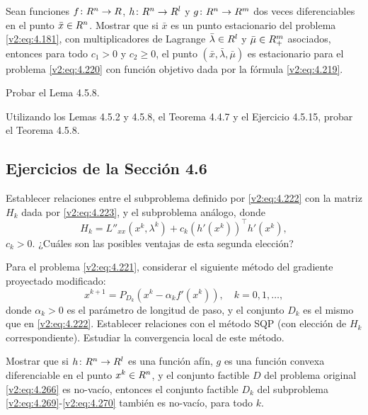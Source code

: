 \begin{exercise}\label{v2:ejer:4.5.15}
    Sean funciones $f \colon R^n \to R$, $h \colon R^n \to R^l$ y $g \colon R^n \to R^m$ dos veces diferenciables en el punto $\bar{x} \in R^n$. Mostrar que si $\bar{x}$ es un punto estacionario del problema \eqref{v2:eq:4.181}, con multiplicadores de Lagrange $\bar{\lambda} \in R^l$ y $\bar{\mu} \in R^m_+$ asociados, entonces para todo $c_1 > 0$ y $c_2 \ge 0$, el punto $(\bar{x}, \bar{\lambda}, \bar{\mu})$ es estacionario para el problema \eqref{v2:eq:4.220} con función objetivo dada por la fórmula \eqref{v2:eq:4.219}.
\end{exercise}

\begin{exercise}\label{v2:ejer:4.5.16}
    Probar el Lema 4.5.8.
\end{exercise}

\begin{exercise}\label{v2:ejer:4.5.17}
    Utilizando los Lemas 4.5.2 y 4.5.8, el Teorema 4.4.7 y el Ejercicio 4.5.15, probar el Teorema 4.5.8.
\end{exercise}

\subsection*{Ejercicios de la Sección 4.6}

\begin{exercise}\label{v2:ejer:4.6.1}
    Establecer relaciones entre el subproblema definido por \eqref{v2:eq:4.222} con la matriz $H_k$ dada por \eqref{v2:eq:4.223}, y el subproblema análogo, donde
    \[
        H_k = L''_{xx}(x^k, \lambda^k) + c_k(h'(x^k))^\top h'(x^k),
    \]
    $c_k > 0$. ¿Cuáles son las posibles ventajas de esta segunda elección?
\end{exercise}

\begin{exercise}\label{v2:ejer:4.6.2}
    Para el problema \eqref{v2:eq:4.221}, considerar el siguiente método del gradiente proyectado modificado:
    \[
        x^{k+1} = P_{D_k}(x^k - \alpha_k f'(x^k)), \quad k = 0, 1, \dots,
    \]
    donde $\alpha_k > 0$ es el parámetro de longitud de paso, y el conjunto $D_k$ es el mismo que en \eqref{v2:eq:4.222}. Establecer relaciones con el método SQP (con elección de $H_k$ correspondiente). Estudiar la convergencia local de este método.
\end{exercise}

\begin{exercise}\label{v2:ejer:4.6.3}
    Mostrar que si $h \colon R^n \to R^l$ es una función afín, $g$ es una función convexa diferenciable en el punto $x^k \in R^n$, y el conjunto factible $D$ del problema original \eqref{v2:eq:4.266} es no-vacío, entonces el conjunto factible $D_k$ del subproblema \eqref{v2:eq:4.269}-\eqref{v2:eq:4.270} también es no-vacío, para todo $k$.
\end{exercise}

